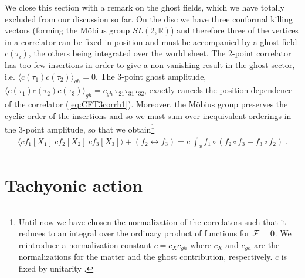 \documentclass[a4paper,11pt]{article}               \def\new#1\endnew{{\bf #1}}
\let\bra=\langle        \let\ket=\rangle
\newcommand {\cF} {{\cal F}}
\newcommand {\bbR}{\mathbb{R}}
\begin{document}
We close this section with a remark on the ghost fields, which we have 
totally excluded from our discussion so far.
On the disc we have three conformal killing vectors (forming the M\"obius
group $SL(2,\bbR)$) and therefore three of
the vertices in a correlator can be fixed in position and must be 
accompanied by a ghost field $c(\tau_i)$, the 
others being integrated over the world sheet. The 2-point correlator has too
few insertions in order to give a non-vanishing result in the ghost sector,
i.e. $\bra c(\tau_1)c(\tau_2) \ket_{gh} = 0$. The 3-point ghost amplitude, 
$\bra c(\tau_1)c(\tau_2)c(\tau_3) \ket_{gh} 
        = c_{gh}~\tau_{21}\tau_{31}\tau_{32}$,
exactly cancels the position dependence of the correlator 
(\ref{eq:CFT3corrh1}). Moreover, the M\"obius group preserves
the cyclic order of the insertions and so we must sum over inequivalent
orderings in the 3-point amplitude, so that we obtain\footnote{%
  Until now we have chosen the normalization of the correlators such
  that it reduces to an integral over the ordinary product of
  functions for
  $\cF=0$. We reintroduce a normalization constant $c = c_X c_{gh}$
  where $c_X$ and $c_{gh}$ are the normalizations for the matter
  and the ghost contribution, respectively. $c$ is fixed by unitarity
  \cite{Polchinski:1998rq}.
}
\begin{eqnarray}
  \label{eq:fullcorr}
  \bra cf_1[X_1]~cf_2[X_2]~cf_3[X_3]\ket + (f_2 \leftrightarrow f_3) =
  c~\int _x f_1\circ (f_2\circ f_3+f_3\circ f_2)~.
\end{eqnarray}


\section{Tachyonic action}
\label{sec:tachyon}
\end{document}

